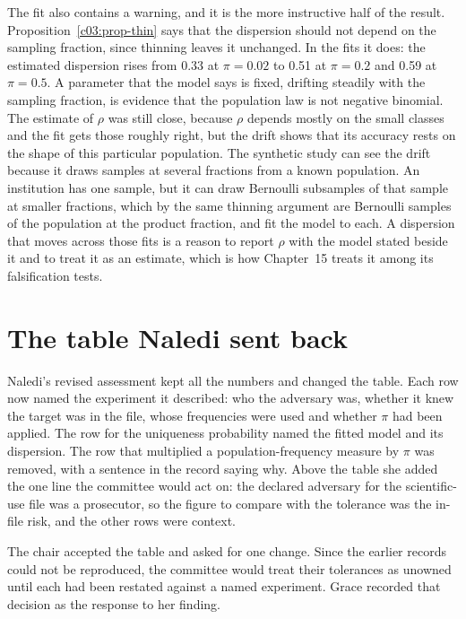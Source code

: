 The fit also contains a warning, and it is the more instructive half of the result.
Proposition~\ref{c03:prop-thin} says that the dispersion should not depend on the
sampling fraction, since thinning leaves it unchanged. In the fits it does: the
estimated dispersion rises from 0.33 at $\pi = 0.02$ to 0.51 at $\pi = 0.2$ and 0.59 at
$\pi = 0.5$.
A parameter that the model says is fixed, drifting steadily with the sampling fraction,
is evidence that the population law is not negative binomial. The estimate of $\rho$ was
still close, because $\rho$ depends mostly on the small classes and the fit gets those
roughly right, but the drift shows that its accuracy rests on the shape of this
particular population. The synthetic study can see the drift because it draws samples
at several fractions from a known population. An institution has one sample, but it can
draw Bernoulli subsamples of that sample at smaller fractions, which by the same
thinning argument are Bernoulli samples of the population at the product fraction, and
fit the model to each. A dispersion that moves across those fits is a reason to report
$\rho$ with the model stated beside it and to treat it as an estimate, which is how
Chapter~15 treats it among its falsification tests.

\section{The table Naledi sent back}

Naledi's revised assessment kept all the numbers and changed the table. Each row now
named the experiment it described: who the adversary was, whether it knew the target
was in the file, whose frequencies were used and whether $\pi$ had been applied. The row
for the uniqueness probability named the fitted model and its dispersion. The row that
multiplied a population-frequency measure by $\pi$ was removed, with a sentence in the
record saying why. Above the table she added the one line the committee would act on:
the declared adversary for the scientific-use file was a prosecutor, so the figure to
compare with the tolerance was the in-file risk, and the other rows were context.

The chair accepted the table and asked for one change. Since the earlier records could
not be reproduced, the committee would treat their tolerances as unowned until each
had been restated against a named experiment. Grace recorded that decision as the
response to her finding.

